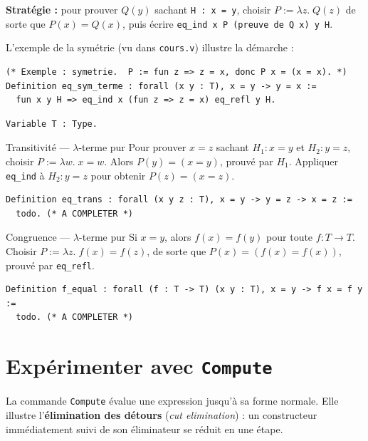 \documentclass[11pt,a4paper]{article}
\begin{document}
\textbf{Stratégie :} pour prouver $Q(y)$ sachant \texttt{H~:~x~=~y}, choisir $P := \lambda z.\; Q(z)$ de sorte que $P(x) = Q(x)$, puis écrire \texttt{eq\_ind~x~P~(preuve de Q x)~y~H}.

L'exemple de la symétrie (vu dans \texttt{cours.v}) illustre la démarche :
\begin{lstlisting}
(* Exemple : symetrie.  P := fun z => z = x, donc P x = (x = x). *)
Definition eq_sym_terme : forall (x y : T), x = y -> y = x :=
  fun x y H => eq_ind x (fun z => z = x) eq_refl y H.
\end{lstlisting}

\begin{lstlisting}
Variable T : Type.
\end{lstlisting}

\begin{exercice}{Transitivité — $\lambda$-terme pur}{}
  Pour prouver $x = z$ sachant $H_1 : x = y$ et $H_2 : y = z$, choisir $P := \lambda w.\; x = w$.
  Alors $P(y) = (x = y)$, prouvé par $H_1$.
  Appliquer \texttt{eq\_ind} à $H_2 : y = z$ pour obtenir $P(z) = (x = z)$.

\begin{lstlisting}
Definition eq_trans : forall (x y z : T), x = y -> y = z -> x = z :=
  todo. (* A COMPLETER *)
\end{lstlisting}
\end{exercice}

\begin{exercice}{Congruence — $\lambda$-terme pur}{}
  Si $x = y$, alors $f(x) = f(y)$ pour toute $f : T \to T$.
  Choisir $P := \lambda z.\; f(x) = f(z)$, de sorte que $P(x) = (f(x) = f(x))$,
  prouvé par \texttt{eq\_refl}.

\begin{lstlisting}
Definition f_equal : forall (f : T -> T) (x y : T), x = y -> f x = f y :=
  todo. (* A COMPLETER *)
\end{lstlisting}
\end{exercice}

\section{Expérimenter avec \texttt{Compute}}

La commande \texttt{Compute} évalue une expression jusqu'à sa forme normale. Elle illustre l'\textbf{élimination des détours} (\textit{cut elimination}) : un constructeur immédiatement suivi de son éliminateur se réduit en une étape.
\end{document}
